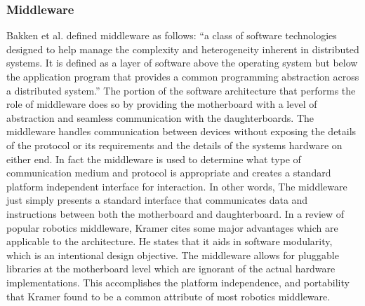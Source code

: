 	\subsubsection{Middleware} %
	\label{ssub:middleware}
	Bakken et al. \parencite{bakken2001middleware} defined middleware as follows: ``a class of software technologies designed to help manage the complexity and heterogeneity inherent in distributed systems. It is defined as a layer of software above the operating system but below the application program that provides a common programming abstraction across a distributed system.'' The portion of the \xten software architecture that performs the role of middleware does so by providing the motherboard with a level of abstraction and seamless communication with the daughterboards. The middleware handles communication between devices without exposing the details of the protocol or its requirements and the details of the systems hardware on either end. In fact the middleware is used to determine what type of communication medium and protocol is appropriate and creates a standard platform independent interface for interaction. In other words, The middleware just simply presents a standard interface that communicates data and instructions between both the motherboard and daughterboard.
	In a review of popular robotics middleware, Kramer \parencite{Kramer2006} cites some major advantages which are applicable to the \xten architecture. He states that it aids in software modularity, which is an intentional design objective. The middleware allows for pluggable libraries at the motherboard level which are ignorant of the actual hardware implementations. This accomplishes the platform independence, and portability that Kramer found to be a common attribute of most robotics middleware.
	
